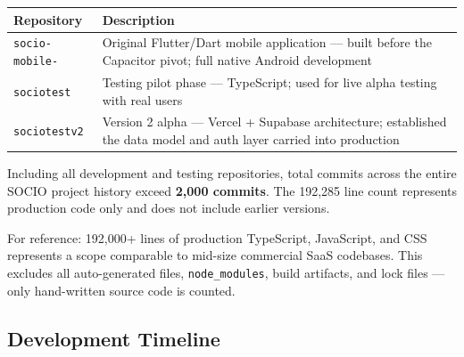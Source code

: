 \documentclass[12pt,a4paper]{article}
\begin{document}
\begin{tabularx}{\textwidth}{L{3.5cm} X}
\toprule
{}
\textbf{Repository} & \textbf{Description} \\
\midrule
\texttt{socio-mobile-} & Original Flutter/Dart mobile application — built before the Capacitor pivot; full native Android development \\
\texttt{sociotest} & Testing pilot phase — TypeScript; used for live alpha testing with real users \\
\texttt{sociotestv2} & Version 2 alpha — Vercel + Supabase architecture; established the data model and auth layer carried into production \\
\bottomrule
\end{tabularx}

\vspace{0.4cm}

Including all development and testing repositories, total commits across the entire SOCIO project history exceed \textbf{2,000 commits}. The 192,285 line count represents production code only and does not include earlier versions.

For reference: 192,000+ lines of production TypeScript, JavaScript, and CSS represents a scope comparable to mid-size commercial SaaS codebases. This excludes all auto-generated files, \texttt{node\_modules}, build artifacts, and lock files — only hand-written source code is counted.

\subsection{Development Timeline}
\end{document}

